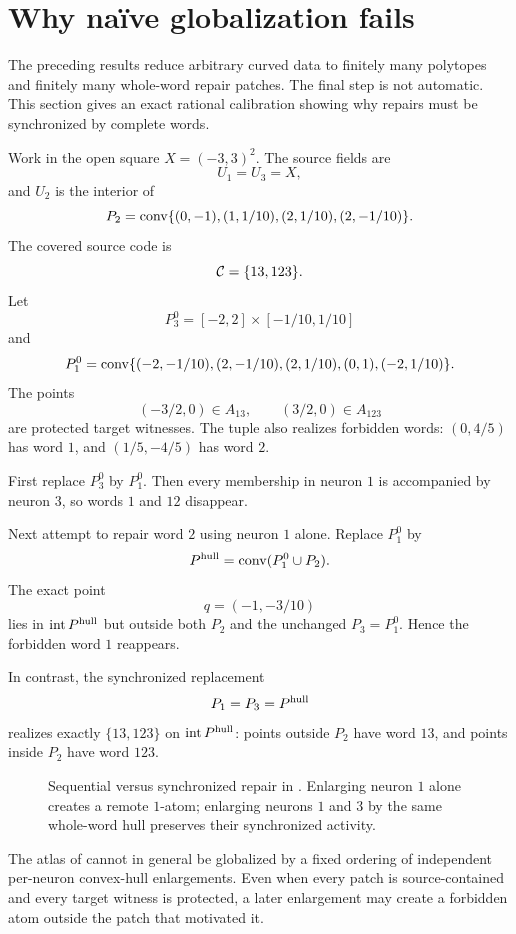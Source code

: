 \section{Why naïve globalization fails}
\label{sec:failed-shortcuts}

The preceding results reduce arbitrary curved data to finitely many polytopes and finitely many whole-word repair patches.  The final step is not automatic.  This section gives an exact rational calibration showing why repairs must be synchronized by complete words.

\begin{example}
\label{ex:sequential-failure}
Work in the open square $X=(-3,3)^2$.  The source fields are
\[
 U_1=U_3=X,
\]
and $U_2$ is the interior of
\[
 P_2=\operatorname{conv}\{(0,-1),(1,1/10),(2,1/10),(2,-1/10)\}.
\]
The covered source code is
\[
 \mathcal C=\{13,123\}.
\]
Let
\[
 P_3^0=[-2,2]\times[-1/10,1/10]
\]
and
\[
 P_1^0=\operatorname{conv}\{(-2,-1/10),(2,-1/10),(2,1/10),(0,1),(-2,1/10)\}.
\]
The points
\[
 (-3/2,0)\in A_{13},
 \qquad
 (3/2,0)\in A_{123}
\]
are protected target witnesses.  The tuple also realizes forbidden words: $(0,4/5)$ has word $1$, and $(1/5,-4/5)$ has word $2$.

First replace $P_3^0$ by $P_1^0$.  Then every membership in neuron $1$ is accompanied by neuron $3$, so words $1$ and $12$ disappear.

Next attempt to repair word $2$ using neuron $1$ alone.  Replace $P_1^0$ by
\[
 P^{\rm hull}=\operatorname{conv}(P_1^0\cup P_2).
\]
The exact point
\[
 q=(-1,-3/10)
\]
lies in $\operatorname{int}P^{\rm hull}$ but outside both $P_2$ and the unchanged $P_3=P_1^0$.  Hence the forbidden word $1$ reappears.

In contrast, the synchronized replacement
\[
 P_1=P_3=P^{\rm hull}
\]
realizes exactly $\{13,123\}$ on $\operatorname{int}P^{\rm hull}$: points outside $P_2$ have word $13$, and points inside $P_2$ have word $123$.
\end{example}

\begin{figure}[t]
\centering

\caption{Sequential versus synchronized repair in .  Enlarging neuron $1$ alone creates a remote $1$-atom; enlarging neurons $1$ and $3$ by the same whole-word hull preserves their synchronized activity.}
\label{fig:sequential-failure}
\end{figure}

\begin{proposition}
The atlas of  cannot in general be globalized by a fixed ordering of independent per-neuron convex-hull enlargements.  Even when every patch is source-contained and every target witness is protected, a later enlargement may create a forbidden atom outside the patch that motivated it.
\end{proposition}

